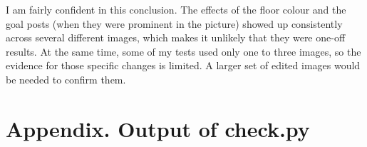 \documentclass[11pt]{article}
\begin{document}
I am fairly confident in this conclusion. The effects of the floor colour and the
goal posts (when they were prominent in the picture) showed up consistently across
several different images, which makes it unlikely that they were one-off results.
At the same time, some of my tests used only one to three images, so the evidence
for those specific changes is limited. A larger set of edited images would be
needed to confirm them.

\section*{Appendix. Output of check.py}
\end{document}
